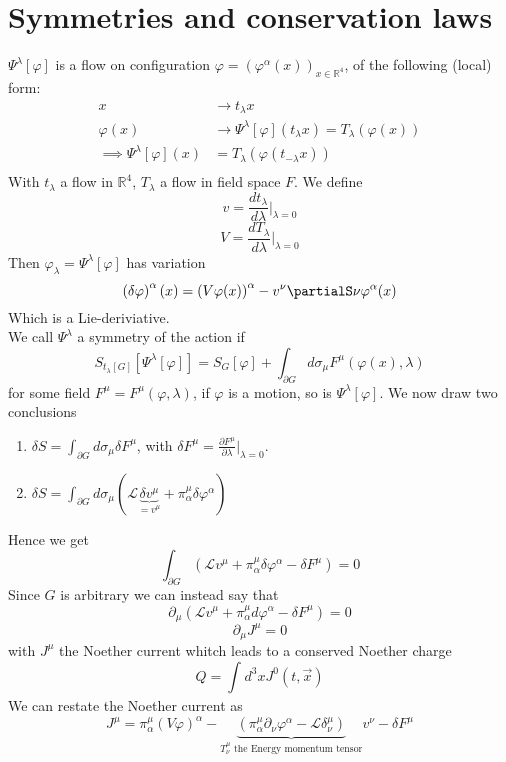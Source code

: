 \documentclass{report}
\begin{document}
\section{Symmetries and conservation laws}
$\Psi^{\lambda} \left[ \varphi \right]$ is a flow on configuration $\varphi = \left( \varphi^{\alpha} \left( x \right)  \right)_{x \in \mathbb{R}^{4} } $, of the following (local) form:
\begin{align*}
  x &\to t_\lambda x \\
  \varphi\left( x \right) &\to \Psi^{\lambda}\left[ \varphi \right]\left( t_\lambda x \right) = T_\lambda\left( \varphi( x ) \right) \\

  \implies \Psi^{\lambda} \left[ \varphi \right] \left( x \right) &= T_\lambda\left( \varphi\left( t_{-\lambda} x \right)  \right)  \\
\end{align*}
With $t_\lambda$ a flow in $\mathbb{R}^{4} $, $T_\lambda$ a flow in field space $F$. We define \[
v = \frac{dt_\lambda}{d \lambda} |_{\lambda=0} 
\] \[
V = \frac{d T_\lambda}{d \lambda} |_{\lambda= 0} 
\] Then $\varphi_\lambda = \Psi^{\lambda} \left[ \varphi \right] $ has variation \[
\left( \delta \varphi \right) ^{\alpha} ( x ) = \left( V \varphi( x ) \right) ^{\alpha} - v^{\nu} \partialS\nu \varphi^{\alpha} ( x )
\] Which is a Lie-deriviative. \\
We call $\Psi^{\lambda} $ a symmetry of the action if \[
S_{t_\lambda \left[ G \right] } \left[ \Psi^{\lambda} \left[ \varphi \right]  \right] = S_G \left[ \varphi \right] + \int_{\partial G}^{} d\sigma_\mu F^{\mu} \left( \varphi\left( x \right) , \lambda \right) 
\] for some field $F^{\mu} = F^{\mu} \left( \varphi, \lambda \right) $, if $\varphi$ is a motion, so is $\Psi^{\lambda}\left[ \varphi \right]  $. We now draw two conclusions
\begin{enumerate}
  \item $\delta S = \int_{\partial G}^{} d\sigma_\mu \delta F^{\mu} $, with $\delta F^{\mu} = \frac{\partial F^{\mu} }{\partial \lambda} |_{\lambda=0} $.
  \item $\delta S = \int_{\partial G}^{} d\sigma_\mu \left( \mathcal{L} \underbrace{\delta v^{\mu} }_{= v^{\mu} }  + \pi^{\mu}_\alpha \delta \varphi^{\alpha}  \right)  $
\end{enumerate}
Hence we get \[
\int_{\partial G}^{} \left( \mathcal{L} v^{\mu} + \pi^{\mu}_\alpha \delta \varphi^{\alpha} - \delta F^{\mu}  \right)  = 0
\] Since $G$ is arbitrary we can instead say that \[
\partial_\mu \left( \mathcal{L} v^{\mu} + \pi^{\mu}_\alpha d\varphi^{\alpha} - \delta F^{\mu}  \right)  = 0
\] \[
\partial_\mu J^{\mu} = 0 
\] with $J^{\mu} $ the Noether current whitch leads to a conserved Noether charge \[
Q = \int_{}^{} d^3x J^{0}\left( t, \vec{x} \right)  
\] We can restate the Noether current as \[
J^{\mu} = \pi^{\mu}_\alpha \left( V\varphi \right)^{\alpha} - \underbrace{ \left( \pi^{\mu}_\alpha \partial_\nu \varphi^{\alpha} - \mathcal{L} \delta^{\mu}_\nu  \right)}_{T^{\mu}_\nu \text{ the Energy momentum tensor}}  v^{\nu} - \delta F^{\mu} 
\] 
\end{document}
